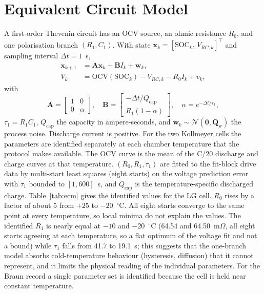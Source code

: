 \documentclass[journal]{IEEEtran}
\newcommand{\T}{^{\!\top}}
\newcommand{\SOC}{\mathrm{SOC}}
\newcommand{\OCV}{\mathrm{OCV}}
\newcommand{\vx}{\boldsymbol{x}}
\newcommand{\mQ}{\mathbf{Q}_{\mathrm{w}}}
\newcommand{\mA}{\mathbf{A}}
\newcommand{\mB}{\mathbf{B}}
\begin{document}
\section{Equivalent Circuit Model}\label{sec:ecm}
A first-order Thevenin circuit has an OCV source, an ohmic resistance $R_0$, and one polarisation branch $(R_1,C_1)$. With state $\vx_k=[\SOC_k,\,V_{RC,k}]\T$ and sampling interval $\Delta t=1$~s,
\begin{align}
\vx_{k+1} &= \mA\vx_k+\mB I_k+\mathbf{w}_k,\\
V_k &= \OCV(\SOC_k)-V_{RC,k}-R_0 I_k+v_k,
\end{align}
with
\begin{equation}
\mA=\begin{bmatrix}1&0\\0&\alpha\end{bmatrix},\quad
\mB=\begin{bmatrix}-\Delta t/Q_{\mathrm{cap}}\\ R_1(1-\alpha)\end{bmatrix},\quad \alpha=e^{-\Delta t/\tau_1},
\end{equation}
$\tau_1=R_1C_1$, $Q_{\mathrm{cap}}$ the capacity in ampere-seconds, and $\mathbf{w}_k\sim\mathcal N(\mathbf 0,\mQ)$ the process noise. Discharge current is positive. For the two Kollmeyer cells the parameters are identified separately at each chamber temperature that the protocol makes available. The OCV curve is the mean of the C/20 discharge and charge curves at that temperature. $(R_0,R_1,\tau_1)$ are fitted to the fit-block drive data by multi-start least squares (eight starts) on the voltage prediction error with $\tau_1$ bounded to $[1,600]$~s, and $Q_{\mathrm{cap}}$ is the temperature-specific discharged charge. Table~\ref{tab:ecm} gives the identified values for the LG cell. $R_0$ rises by a factor of about 5 from $+25$ to $-20$~$^\circ$C. All eight starts converge to the same point at every temperature, so local minima do not explain the values. The identified $R_1$ is nearly equal at $-10$ and $-20$~$^\circ$C (64.54 and 64.50~m$\Omega$, all eight starts agreeing at each temperature, so a flat optimum of the voltage fit and not a bound) while $\tau_1$ falls from 41.7 to 19.1~s; this suggests that the one-branch model absorbs cold-temperature behaviour (hysteresis, diffusion) that it cannot represent, and it limits the physical reading of the individual parameters. For the Braun record a single parameter set is identified because the cell is held near constant temperature.
\end{document}
